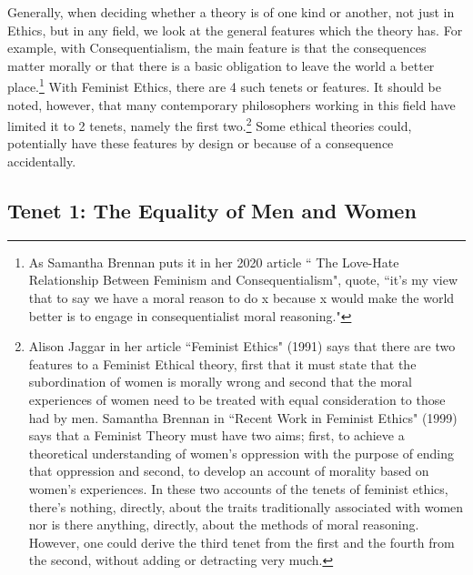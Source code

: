 Generally, when deciding whether a theory is of one kind or another, not just in Ethics, but in any field, we look at the general features which the theory has. For example, with Consequentialism, the main feature is that the consequences matter morally or that there is a basic obligation to leave the world a better place.\footnote{As Samantha Brennan puts it in her 2020 article `` The Love-Hate Relationship Between Feminism and Consequentialism", quote, ``it's my view that to say we have a moral reason to do x because x would make the world better is to engage in consequentialist moral reasoning."\autocite{Brennan1}} With Feminist Ethics, there are 4 such tenets or features. It should be noted, however, that many contemporary philosophers working in this field have limited it to 2 tenets, namely the first two.\footnote{Alison Jaggar in her article ``Feminist Ethics" (1991) says that there are two features to a Feminist Ethical theory, first that it must state that the subordination of women is morally wrong and second that the moral experiences of women need to be treated with equal consideration to those had by men.\autocite{Jaggar1} Samantha Brennan in ``Recent Work in Feminist Ethics" (1999) says that a Feminist Theory must have two aims; first, to achieve a theoretical understanding of women's oppression with the purpose of ending that oppression and second, to develop an account of morality based on women's experiences.\autocite{Brennan2} In these two accounts of the tenets of feminist ethics, there's nothing, directly, about the traits traditionally associated with women nor is there anything, directly, about the methods of moral reasoning. However, one could derive the third tenet from the first and the fourth from the second, without adding or detracting very much. } Some ethical theories could, potentially have these features by design or because of a consequence accidentally.

\subsection{Tenet 1: The Equality of Men and Women}

